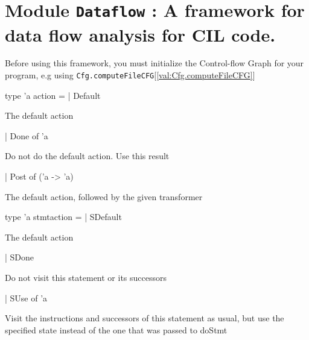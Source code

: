 \documentclass[11pt]{article}
\begin{document}
\section{Module {\tt{Dataflow}} : A framework for data flow analysis for CIL code.}
\label{module:Dataflow}
  Before using 
    this framework, you must initialize the Control-flow Graph for your
    program, e.g using {\tt{Cfg.computeFileCFG}}[\ref{val:Cfg.computeFileCFG}]



\ocamldocvspace{0.5cm}



\label{type:Dataflow.action}\begin{ocamldoccode}
type 'a action =
  | Default
\end{ocamldoccode}
\begin{ocamldoccomment}
The default action
\end{ocamldoccomment}
\begin{ocamldoccode}
  | Done of 'a
\end{ocamldoccode}
\begin{ocamldoccomment}
Do not do the default action. Use this result
\end{ocamldoccomment}
\begin{ocamldoccode}
  | Post of ('a -> 'a)
\end{ocamldoccode}
\begin{ocamldoccomment}
The default action, followed by the given 
 transformer
\end{ocamldoccomment}




\label{type:Dataflow.stmtaction}\begin{ocamldoccode}
type 'a stmtaction =
  | SDefault
\end{ocamldoccode}
\begin{ocamldoccomment}
The default action
\end{ocamldoccomment}
\begin{ocamldoccode}
  | SDone
\end{ocamldoccode}
\begin{ocamldoccomment}
Do not visit this statement or its successors
\end{ocamldoccomment}
\begin{ocamldoccode}
  | SUse of 'a
\end{ocamldoccode}
\begin{ocamldoccomment}
Visit the instructions and successors of this statement
                  as usual, but use the specified state instead of the 
                  one that was passed to doStmt
\end{ocamldoccomment}
\end{document}
